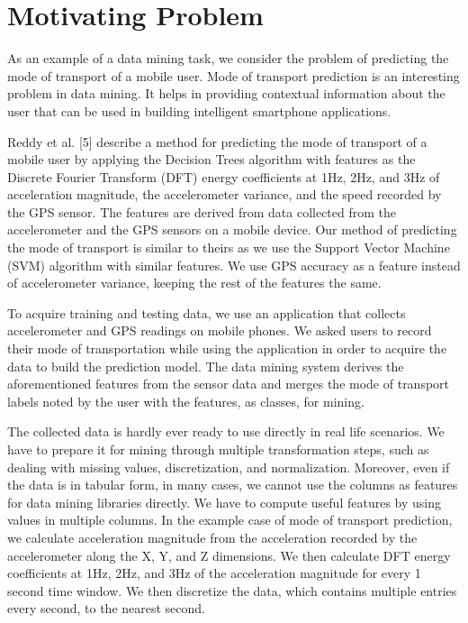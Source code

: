 \section{Motivating Problem}

As an example of a data mining task, we consider the problem of predicting the mode of transport of a mobile user. Mode of transport prediction is an interesting problem in data mining. It helps in providing contextual information about the user that can be used in building intelligent smartphone applications.

Reddy et al. [5] describe a method for predicting the mode of transport of a mobile user by applying the Decision Trees algorithm with features as the Discrete Fourier Transform (DFT) energy coefficients at 1Hz, 2Hz, and 3Hz of acceleration magnitude, the accelerometer variance, and the speed recorded by the GPS sensor. The features are derived from data collected from the accelerometer and the GPS sensors on a mobile device. Our method of predicting the mode of transport is similar to theirs as we use the Support Vector Machine (SVM) algorithm with similar features. We use GPS accuracy as a feature instead of accelerometer variance, keeping the rest of the features the same.

To acquire training and testing data, we use an application that collects accelerometer and GPS readings on mobile phones. We asked users to record their mode of transportation while using the application in order to acquire the data to build the prediction model. The data mining system derives the aforementioned features from the sensor data and merges the mode of transport labels noted by the user with the features, as classes, for mining.

The collected data is hardly ever ready to use directly in real life scenarios. We have to prepare it for mining through multiple transformation steps, such as dealing with missing values, discretization, and normalization. Moreover, even if the data is in tabular form, in many cases, we cannot use the columns as features for data mining libraries directly. We have to compute useful features by using values in multiple columns. In the example case of mode of transport prediction, we calculate acceleration magnitude from the acceleration recorded by the accelerometer along the X, Y, and Z dimensions. We then calculate DFT energy coefficients at 1Hz, 2Hz, and 3Hz of the acceleration magnitude for every 1 second time window. We then discretize the data, which contains multiple entries every second, to the nearest second. 

